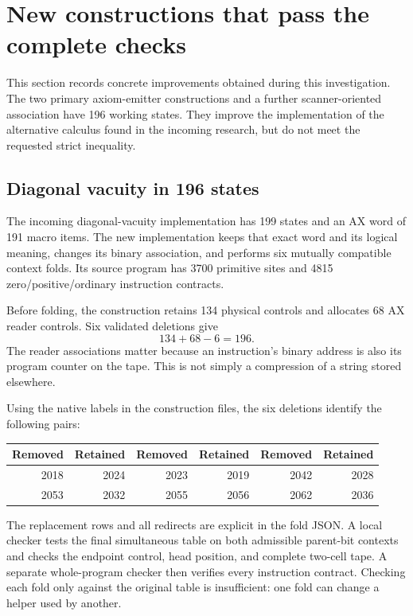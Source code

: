 \section{New constructions that pass the complete checks}
\label{sec:constructions}
This section records concrete improvements obtained during this investigation. The two primary axiom-emitter constructions and a further scanner-oriented association have 196 working states. They improve the implementation of the alternative calculus found in the incoming research, but do not meet the requested strict inequality.

\subsection{Diagonal vacuity in 196 states}
The incoming diagonal-vacuity implementation has 199 states and an AX word of 191 macro items. The new implementation keeps that exact word and its logical meaning, changes its binary association, and performs six mutually compatible context folds. Its source program has 3700 primitive sites and 4815 zero/positive/ordinary instruction contracts.

Before folding, the construction retains 134 physical controls and allocates 68 AX reader controls. Six validated deletions give
\[
 134+68-6=196.
\]
The reader associations matter because an instruction's binary address is also its program counter on the tape. This is not simply a compression of a string stored elsewhere.

Using the native labels in the construction files, the six deletions identify the following pairs:
\begin{center}
\begin{tabular}{rr|rr|rr}
\toprule
Removed & Retained & Removed & Retained & Removed & Retained\\
\midrule
2018&2024&2023&2019&2042&2028\\
2053&2032&2055&2056&2062&2036\\
\bottomrule
\end{tabular}
\end{center}
The replacement rows and all redirects are explicit in the fold JSON. A local checker tests the final simultaneous table on both admissible parent-bit contexts and checks the endpoint control, head position, and complete two-cell tape. A separate whole-program checker then verifies every instruction contract. Checking each fold only against the original table is insufficient: one fold can change a helper used by another.

